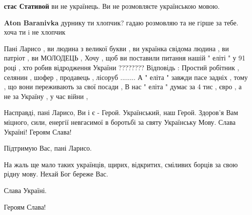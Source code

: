 \begin{itemize}
\begin{itemize}
\begin{itemize}
\textbf{стас Стативой} ви не українець. Ви не розмовляєте українською мовою.

 
\textbf{Aton Baranivka} дурнику ти хлопчик? гадаю розмовляю та не гiрше за тебе. хоча ти i не хлопчик
\end{itemize}

\end{itemize}

 

Пані Ларисо , ви людина з великої букви , ви українка свідома людина , ви
патріот , ви МОЛОДЕЦЬ , Хочу , щоб ви поставили питання нашій " еліті " у 91
році , хто робив відродження України ???????? Відповідь : Простий робітник ,
селянин , шофер , продавець , лісоруб ........ А " еліта " завжди пасе задніх ,
тому , що вони переживають за свої посади , В нас " еліта " думає за 4 тис ,
євро , а не за Україну , у час війни ,


 

Насправді, пані Ларисо, Ви і є - Герой. Український, наш Герой. Здоров'я Вам
міцного, сили, енергії невгасимої в боротьбі за святу Українську Мову. Слава
Україні! Героям Слава!


 

Підтримую Вас, пані Ларисо.

На жаль ще мало таких українців, щирих, відкритих, сміливих борців за свою
рідну мову. Нехай Бог береже Вас.

Слава Україні.

Героям Слава!


\end{itemize}
